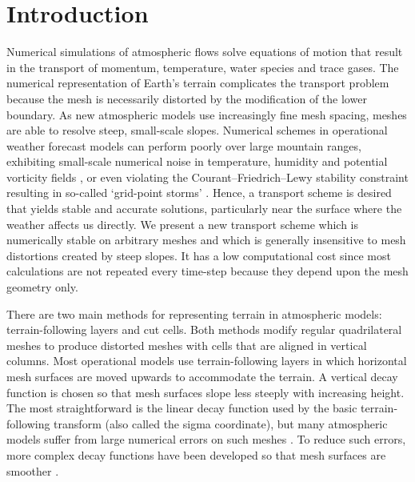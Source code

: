 \section{Introduction}

Numerical simulations of atmospheric flows solve equations of motion that result in the transport of momentum, temperature, water species and trace gases.  The numerical representation of Earth's terrain complicates the transport problem because the mesh is necessarily distorted by the modification of the lower boundary.
As new atmospheric models use increasingly fine mesh spacing, meshes are able to resolve steep, small-scale slopes.  Numerical schemes in operational weather forecast models can perform poorly over large mountain ranges, exhibiting small-scale numerical noise in temperature, humidity \citep{schaer2002} and potential vorticity fields \citep{hoinka-zaengl2004}, or even violating the Courant--Friedrich--Lewy stability constraint resulting in so-called `grid-point storms' \citep{webster2003} .
Hence, a transport scheme is desired that yields stable and accurate solutions, particularly near the surface where the weather affects us directly.
We present a new transport scheme which is numerically stable on arbitrary meshes and which is generally insensitive to mesh distortions created by steep slopes.  It has a low computational cost since most calculations are not repeated every time-step because they depend upon the mesh geometry only.

There are two main methods for representing terrain in atmospheric models: terrain-following layers and cut cells.  Both methods modify regular quadrilateral meshes to produce distorted meshes with cells that are aligned in vertical columns.  Most operational models use terrain-following layers in which horizontal mesh surfaces are moved upwards to accommodate the terrain.  A vertical decay function is chosen so that mesh surfaces slope less steeply with increasing height.
The most straightforward is the linear decay function used by the basic terrain-following transform \citep{galchen-somerville1975} (also called the sigma coordinate), but many atmospheric models suffer from large numerical errors on such meshes \citep{schaer2002,klemp2011,eckermann2014}.
To reduce such errors, more complex decay functions have been developed so that mesh surfaces are smoother \citep{simmons-burridge1981,schaer2002,leuenberger2010,klemp2011}.

